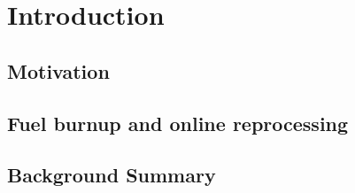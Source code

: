 \chapter[Introduction]{Introduction}
\section{Motivation}

\section{Fuel burnup and online reprocessing}

\section{Background Summary}